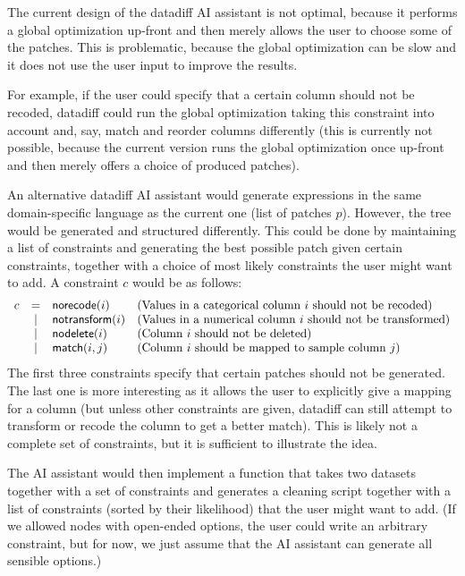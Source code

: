 \documentclass{article}
\begin{document}
The current design of the datadiff AI assistant is not optimal, because it performs a global
optimization up-front and then merely allows the user to choose some of the patches. This is 
problematic, because the global optimization can be slow and it does not use the user input to 
improve the results. 

For example, if the user could specify that a certain column should not be
recoded, datadiff could run the global optimization taking this constraint into account and, say,
match and reorder columns differently (this is currently not possible, because the current version
runs the global optimization once up-front and then merely offers a choice of produced patches).

An alternative datadiff AI assistant would generate expressions in the same domain-specific 
language as the current one (list of patches $p$). However, the tree would be generated and 
structured differently. This could be done by maintaining a list of constraints and generating
the best possible patch given certain constraints, together with a choice of most likely constraints
the user might want to add. A constraint $c$ would be as follows:
%
\begin{equation*}
\begin{array}{lcll}
c &=& \textnormal{\sffamily norecode}(i) &\textnormal{(Values in a categorical column $i$ should not be recoded)}\\
  &|& \textnormal{\sffamily notransform}(i)&\textnormal{(Values in a numerical column $i$ should not be transformed)}\\
  &|& \textnormal{\sffamily nodelete}(i)&\textnormal{(Column $i$ should not be deleted)}\\
  &|& \textnormal{\sffamily match}(i,j)&\textnormal{(Column $i$ should be mapped to sample column $j$)}
\end{array}
\end{equation*}
%
The first three constraints specify that certain patches should not be generated. The last one is
more interesting as it allows the user to explicitly give a mapping for a column (but unless other
constraints are given, datadiff can still attempt to transform or recode the column to get a 
better match). This is likely not a complete set of constraints, but it is sufficient to illustrate
the idea.

The AI assistant would then implement a function that takes two datasets together with a set of 
constraints and generates a cleaning script together with a list of constraints (sorted by their
likelihood) that the user might want to add. (If we allowed nodes with open-ended options, the
user could write an arbitrary constraint, but for now, we just assume that the AI assistant can
generate all sensible options.)
\end{document}
